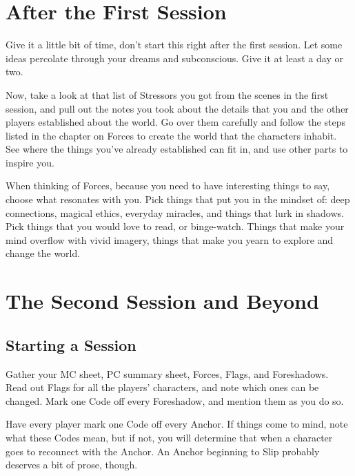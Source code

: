 \documentclass[10pt,twoside,openright]{memoir}
\begin{document}
\hypertarget{after-the-first-session}{%
\section{After the First Session}\label{after-the-first-session}}

Give it a little bit of time, don't start this right after the first
session. Let some ideas percolate through your dreams and subconscious.
Give it at least a day or two.

Now, take a look at that list of Stressors you got from the scenes in
the first session, and pull out the notes you took about the details
that you and the other players established about the world. Go over them
carefully and follow the steps listed in the chapter on Forces to create
the world that the characters inhabit. See where the things you've
already established can fit in, and use other parts to inspire you.

When thinking of Forces, because you need to have interesting things to
say, choose what resonates with you. Pick things that put you in the
mindset of: deep connections, magical ethics, everyday miracles, and
things that lurk in shadows. Pick things that you would love to read, or
binge-watch. Things that make your mind overflow with vivid imagery,
things that make you yearn to explore and change the world.

\hypertarget{the-second-session-and-beyond}{%
\section{The Second Session and
Beyond}\label{the-second-session-and-beyond}}

\hypertarget{starting-a-session-1}{%
\subsection{Starting a Session}\label{starting-a-session-1}}

Gather your MC sheet, PC summary sheet, Forces, Flags, and Foreshadows.
Read out Flags for all the players' characters, and note which ones can
be changed. Mark one Code off every Foreshadow, and mention them as you
do so.

Have every player mark one Code off every Anchor. If things come to
mind, note what these Codes mean, but if not, you will determine that
when a character goes to reconnect with the Anchor. An Anchor beginning
to Slip probably deserves a bit of prose, though.
\end{document}
